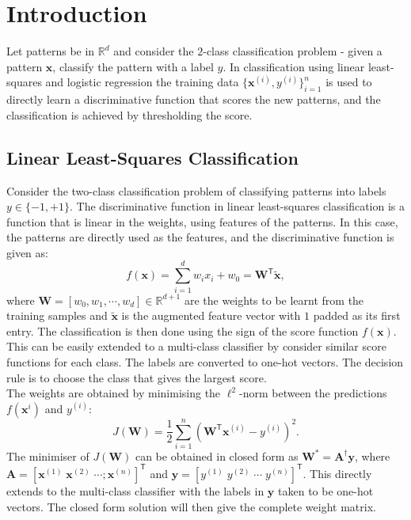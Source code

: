\documentclass[12pt, a4 paper]{article}
\newcommand{\by}{\mathbf{y}}
\newcommand{\bx}{\mathbf{x}}
\newcommand{\bW}{\mathbf{W}}
\newcommand{\bA}{\mathbf{A}}
\newcommand{\rr}{\mathbb{R}}
\newcommand{\TT}{\mathsf{T}}
\begin{document}





\section{Introduction}
\label{sec:intro}

Let patterns be in $\rr^{d}$ and consider the $2$-class classification problem - given a pattern $\bx$, classify the pattern with a label $y$. In classification using linear least-squares and logistic regression the training data $\{\bx^{(i)}, y^{(i)}\}_{i=1}^{n}$ is used to directly learn a discriminative function that scores the new patterns, and the classification is achieved by thresholding the score.


\subsection{Linear Least-Squares Classification}
\label{subsec:linearRegression}

Consider the two-class classification problem of classifying patterns into labels $y \in \{-1, +1\}$. The discriminative function in linear least-squares classification is a function that is linear in the weights, using features of the patterns. In this case, the patterns are directly used as the features, and the discriminative function is given as:
\begin{equation}
	f(\bx) = \sum_{i=1}^{d} w_{i} x_{i} + w_{0} = \bW^{\TT} \tilde{\bx},
\label{eq:linearDiscriminator}
\end{equation}
where $\bW = [w_{0}, w_{1}, \cdots, w_{d}] \in \rr^{d+1}$ are the weights to be learnt from the training samples and $\tilde{\bx}$ is the augmented feature vector with $1$ padded as its first entry. The classification is then done using the sign of the score function $f(\bx)$. \\

This can be easily extended to a multi-class classifier by consider similar score functions for each class. The labels are converted to one-hot vectors. The decision rule is to choose the class that gives the largest score. \\

The weights are obtained by minimising the $\ell^{2}$-norm between the predictions $f(\bx^{i})$ and $y^{(i)}$:
\begin{equation}
	J(\bW) = \frac{1}{2} \sum_{i=1}^{n} \left( \bW^{\TT}\bx^{(i)} - y^{(i)} \right)^{2}.
\label{eq:lsClassifier}
\end{equation}
The minimiser of $J(\bW)$ can be obtained in closed form as $\bW^{*} = \bA^{\dagger} \by$, where $\bA = [\bx^{(1)} \; \bx^{(2)} \; \cdots ; \bx^{(n)}]^{\TT}$ and $\by = [y^{(1)} \; y^{(2)} \; \cdots \; y^{(n)}]^{\TT}$. This directly extends to the multi-class classifier with the labels in $\by$ taken to be one-hot vectors. The closed form solution will then give the complete weight matrix.
\end{document}
